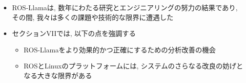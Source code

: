 \begin{frame}{}
    \begin{itemize}
        \item ROS-Llamaは, 数年にわたる研究とエンジニアリングの努力の結果であり, その間, 我々は多くの課題や技術的な限界に遭遇した
        \item セクションVIIでは, 以下の点を強調する
              \begin{itemize}
                  \item  ROS-Llamaをより効果的かつ正確にするための分析改善の機会
                  \item  ROSとLinuxのプラットフォームには, システムのさらなる改良の妨げとなる大きな限界がある
              \end{itemize}
    \end{itemize}
\end{frame}

